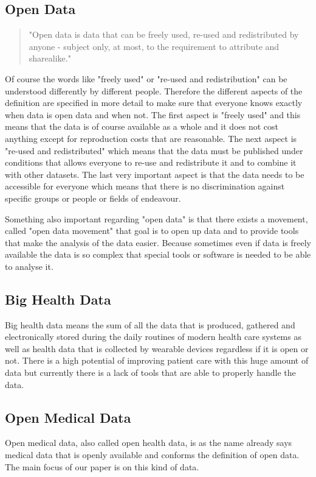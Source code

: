 \documentclass[a4paper, 11pt]{article}
\begin{document}
\subsection{Open Data}
\begin{quote}
    "Open data is data that can be freely used, re-used and redistributed by anyone - subject only, at most, to the requirement to attribute and sharealike." \cite{whatIsOpenData}
\end{quote}
Of course the words like "freely used" or "re-used and redistribution" can be understood differently by different people. Therefore the different aspects of the definition are specified in more detail to make sure that everyone knows exactly when data is open data and when not. The first aspect is "freely used" and this means that the data is of course available as a whole and it does not cost anything except for reproduction costs that are reasonable. 
The next aspect is "re-used and redistributed" which means that the data must be published under conditions that allows everyone to re-use and redistribute it and to combine it with other datasets. 
The last very important aspect is that the data needs to be accessible for everyone which means that there is no discrimination against specific groups or people or fields of endeavour. \cite{whatIsOpenData}

Something also important regarding "open data" is that there exists a movement, called "open data movement" that goal is to open up data and to provide tools that make the analysis of the data easier. Because sometimes even if data is freely available the data is so complex that special tools or software is needed to be able to analyse it. \cite{kitchin2014dataRevolution}

\subsection{Big Health Data}
Big health data means the sum of all the data that is produced, gathered and electronically stored during the daily routines of modern health care systems as well as health data that is collected by wearable devices regardless if it is open or not. There is a high potential of improving patient care with this huge amount of data but currently there is a lack of tools that are able to properly handle the data. \cite{schneeweiss2014learning} \cite{Kostkova_et_al_2016}

\subsection{Open Medical Data}
Open medical data, also called open health data, is as the name already says medical data that is openly available and conforms the definition of open data. The main focus of our paper is on this kind of data. 
\end{document}

